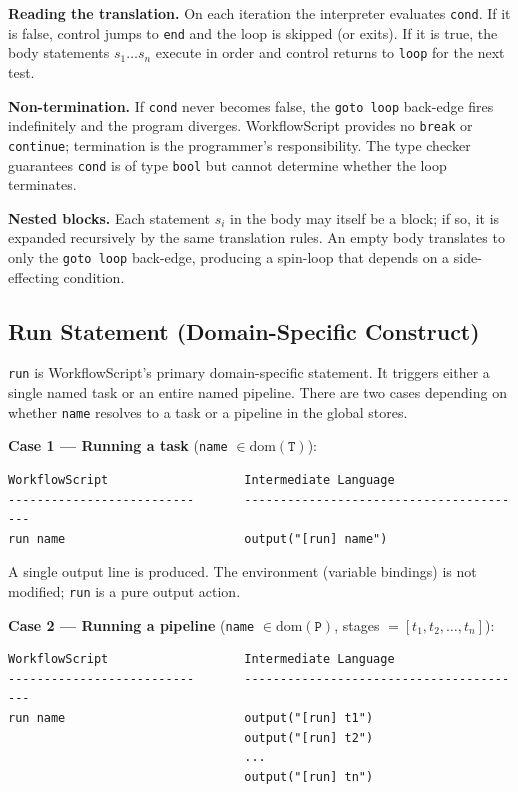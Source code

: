 \documentclass[10pt,a4paper]{article}
\begin{document}
\textbf{Reading the translation.}
On each iteration the interpreter evaluates \texttt{cond}. If it is false, control jumps to
\texttt{end} and the loop is skipped (or exits). If it is true, the body statements
$s_1 \ldots s_n$ execute in order and control returns to \texttt{loop} for the next test.

\textbf{Non-termination.}
If \texttt{cond} never becomes false, the \texttt{goto loop} back-edge fires indefinitely
and the program diverges. WorkflowScript provides no \texttt{break} or \texttt{continue};
termination is the programmer's responsibility. The type checker guarantees \texttt{cond}
is of type \texttt{bool} but cannot determine whether the loop terminates.

\textbf{Nested blocks.}
Each statement $s_i$ in the body may itself be a block; if so, it is expanded recursively
by the same translation rules. An empty body translates to only the \texttt{goto loop}
back-edge, producing a spin-loop that depends on a side-effecting condition.

\subsection{Run Statement (Domain-Specific Construct)}

\texttt{run} is WorkflowScript's primary domain-specific statement. It triggers either a
single named task or an entire named pipeline. There are two cases depending on whether
\texttt{name} resolves to a task or a pipeline in the global stores.

\textbf{Case 1 --- Running a task}
(\texttt{name} $\in \mathrm{dom}(\mathtt{T})$):

\begin{lstlisting}[language={}, caption={Run task translation}]
WorkflowScript                   Intermediate Language
--------------------------       ----------------------------------------
run name                         output("[run] name")
\end{lstlisting}

A single output line is produced. The environment (variable bindings) is not modified;
\texttt{run} is a pure output action.

\textbf{Case 2 --- Running a pipeline}
(\texttt{name} $\in \mathrm{dom}(\mathtt{P})$, stages $= [t_1, t_2, \ldots, t_n]$):

\begin{lstlisting}[language={}, caption={Run pipeline translation}]
WorkflowScript                   Intermediate Language
--------------------------       ----------------------------------------
run name                         output("[run] t1")
                                 output("[run] t2")
                                 ...
                                 output("[run] tn")
\end{lstlisting}
\end{document}
